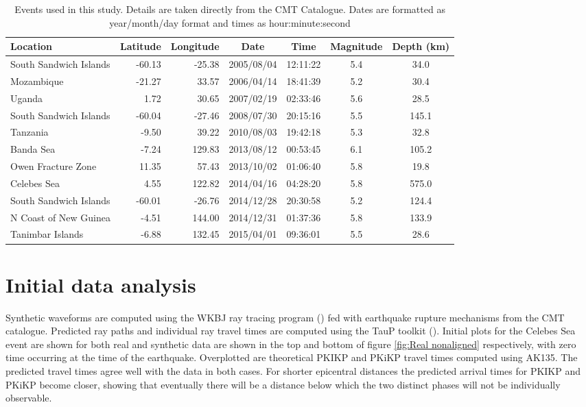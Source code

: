 \documentclass[11pt,a4paper]{article}
\begin{document}
\begin{table}\footnotesize
\centering
\begin{tabular}{| l | r | r | c | c | c | c |}
	\hline Location				& Latitude	& Longitude	& Date		& Time		& Magnitude	& Depth (km) 	\\ \hline
	\hline South Sandwich Islands	& -60.13	& -25.38		& 2005/08/04	& 12:11:22	& 5.4			& 34.0		\\
	\hline Mozambique			& -21.27	& 33.57		& 2006/04/14	& 18:41:39	& 5.2			& 30.4		\\
	\hline Uganda				& 1.72	& 30.65		& 2007/02/19	& 02:33:46	& 5.6			& 28.5		\\
	\hline South Sandwich Islands	& -60.04	& -27.46		& 2008/07/30	& 20:15:16	& 5.5			& 145.1		\\
	\hline Tanzania				& -9.50	& 39.22		& 2010/08/03	& 19:42:18	& 5.3			& 32.8		\\
	\hline Banda Sea			& -7.24	& 129.83		& 2013/08/12	& 00:53:45	& 6.1			& 105.2		\\
	\hline Owen Fracture Zone	& 11.35	& 57.43		& 2013/10/02	& 01:06:40	& 5.8			& 19.8		\\
	\hline Celebes Sea			& 4.55	& 122.82		& 2014/04/16	& 04:28:20	& 5.8			& 575.0  		\\ 
	\hline South Sandwich Islands 	& -60.01	& -26.76		& 2014/12/28	& 20:30:58	& 5.2			& 124.4		\\
	\hline N Coast of New Guinea	& -4.51	& 144.00		& 2014/12/31	& 01:37:36	& 5.8			& 133.9		\\
	\hline Tanimbar Islands		& -6.88	& 132.45		& 2015/04/01	& 09:36:01	& 5.5			& 28.6		\\
	\hline	
\end{tabular}
\caption{Events used in this study. Details are taken directly from the CMT Catalogue. Dates are formatted as year/month/day format and times as hour:minute:second}
\label{tab:Events}
\end{table}


\section{Initial data analysis}
\label{sec:Initial analysis}
Synthetic waveforms are computed using the WKBJ ray tracing program (\cite{Chapman1976}) fed with earthquake rupture mechanisms from the CMT catalogue. Predicted ray paths and individual ray travel times are computed using the TauP toolkit (\cite{Crotwell1999}). Initial plots for the Celebes Sea event are shown for both real and synthetic data are shown in the top and bottom of figure \ref{fig:Real nonaligned} respectively, with zero time occurring at the time of the earthquake. Overplotted are theoretical PKIKP and PKiKP travel times computed using AK135. The predicted travel times agree well with the data in both cases.  For shorter epicentral distances the predicted arrival times for PKIKP and PKiKP become closer, showing that eventually there will be a distance below which the two distinct phases will not be individually observable.
\end{document}
